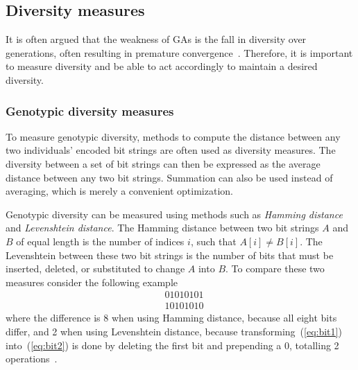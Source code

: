 \subsection{Diversity measures}
\label{sec:diversitymeasures}
It is often argued that the weakness of GAs is the fall in diversity over generations, often resulting in premature convergence~\cite{diaz2007empirical, 1266373,Zitzler00comparisonof}. Therefore, it is important to measure diversity and be able to act accordingly to maintain a desired diversity.

\subsubsection{Genotypic diversity measures}
To measure genotypic diversity, methods to compute the distance between any two individuals' encoded bit strings are often used as diversity measures. The diversity between a set of bit strings can then be expressed as the average distance between any two bit strings. Summation can also be used instead of averaging, which is merely a convenient optimization.

Genotypic diversity can be measured using methods such as \emph{Hamming distance} and \emph{Levenshtein distance}. The Hamming distance between two bit strings $A$ and $B$ of equal length is the number of indices $i$, such that $A[i] \neq B[i]$. The Levenshtein between these two bit strings is the number of bits that must be inserted, deleted, or substituted to change $A$ into $B$. To compare these two measures consider the following example 
%
\begin{align}
  &01010101\label{eq:bit1} \\
  &10101010\label{eq:bit2}
\end{align}
%
where the difference is 8 when using Hamming distance, because all eight bits differ, and 2 when using Levenshtein distance, because transforming~(\ref{eq:bit1}) into~(\ref{eq:bit2}) is done by deleting the first bit and prepending a $0$, totalling 2 operations~\cite{1250187}.

